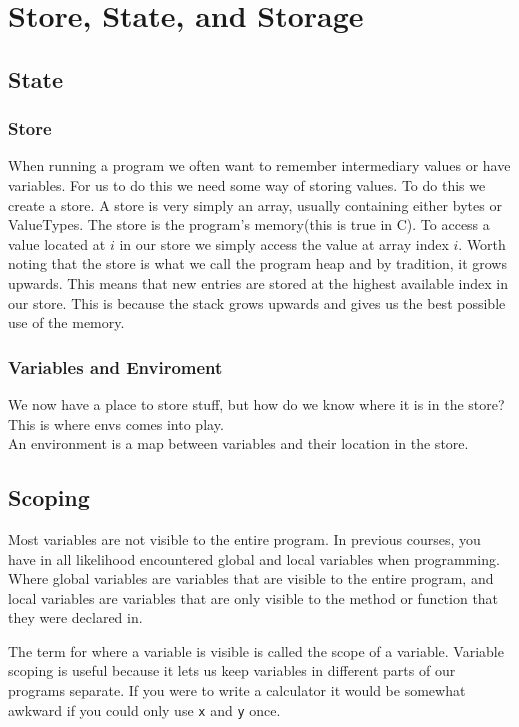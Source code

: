 \chapter{Store, State, and Storage}

\section{State}
\label{sec:state}
\subsection{Store}
\label{subsec:store}
When running a program we often want to remember intermediary values or have variables. For us to do this we need some way of storing values.
To do this we create a \gls{store}. A store is very simply an array, usually containing either bytes or ValueTypes. 
The store is the program's memory(this is true in C). To access a value located at $i$ in our store we simply access the value at array index $i$.
Worth noting that the store is what we call the program heap and by tradition, it grows upwards. This means that new entries are stored at the highest available index in our store.
This is because the stack grows upwards and gives us the best possible use of the memory.

\subsection{Variables and Enviroment}
\label{subsec:vars}
We now have a place to store stuff, but how do we know where it is in the store? This is where \glspl{env} comes into play.\\
An environment is a map between variables and their location in the store. \\
\section{Scoping}
\label{sec:scope}

Most variables are not visible to the entire program.
In previous courses, you have in all likelihood encountered global and local variables when programming.
Where global variables are variables that are visible to the entire program, and local variables are variables that are only visible to the method or function that they were declared in.

The term for where a variable is visible is called the \gls{scope} of a variable.
Variable scoping is useful because it lets us keep variables in different parts of our programs separate.
If you were to write a calculator it would be somewhat awkward if you could only use \texttt{x} and \texttt{y} once.

